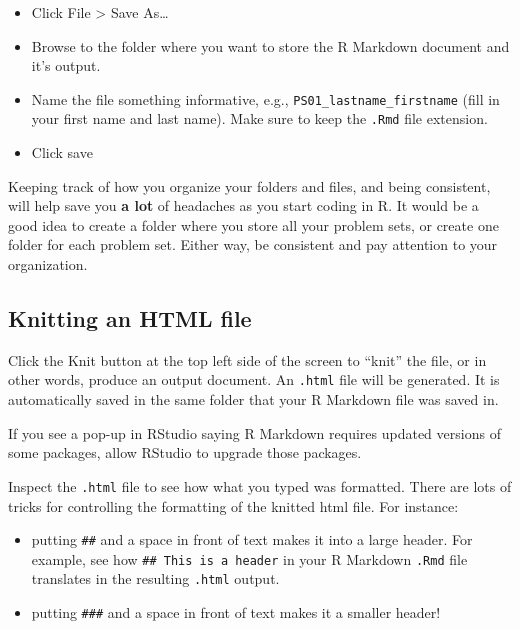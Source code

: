 \documentclass[
]{article}
\providecommand{\tightlist}{%
  \setlength{\itemsep}{0pt}\setlength{\parskip}{0pt}}
\begin{document}
\begin{itemize}
\tightlist
\item
  Click File \textgreater{} Save As\ldots{}
\item
  Browse to the folder where you want to store the R Markdown document
  and it's output.
\item
  Name the file something informative, e.g.,
  \texttt{PS01\_lastname\_firstname} (fill in your first name and last
  name). Make sure to keep the \texttt{.Rmd} file extension.
\item
  Click save
\end{itemize}

\leavevmode\hypertarget{license}{}%
Keeping track of how you organize your folders and files, and being
consistent, will help save you \textbf{a lot} of headaches as you start
coding in R. It would be a good idea to create a folder where you store
all your problem sets, or create one folder for each problem set. Either
way, be consistent and pay attention to your organization.

\hypertarget{knitting-an-html-file}{%
\subsection{Knitting an HTML file}\label{knitting-an-html-file}}

Click the Knit button at the top left side of the screen to ``knit'' the
file, or in other words, produce an output document. An \texttt{.html}
file will be generated. It is automatically saved in the same folder
that your R Markdown file was saved in.

\leavevmode\hypertarget{license}{}%
If you see a pop-up in RStudio saying R Markdown requires updated
versions of some packages, allow RStudio to upgrade those packages.

Inspect the \texttt{.html} file to see how what you typed was formatted.
There are lots of tricks for controlling the formatting of the knitted
html file. For instance:

\begin{itemize}
\tightlist
\item
  putting \texttt{\#\#} and a space in front of text makes it into a
  large header. For example, see how \texttt{\#\#\ This\ is\ a\ header}
  in your R Markdown \texttt{.Rmd} file translates in the resulting
  \texttt{.html} output.
\item
  putting \texttt{\#\#\#} and a space in front of text makes it a
  smaller header!
\end{itemize}
\end{document}
